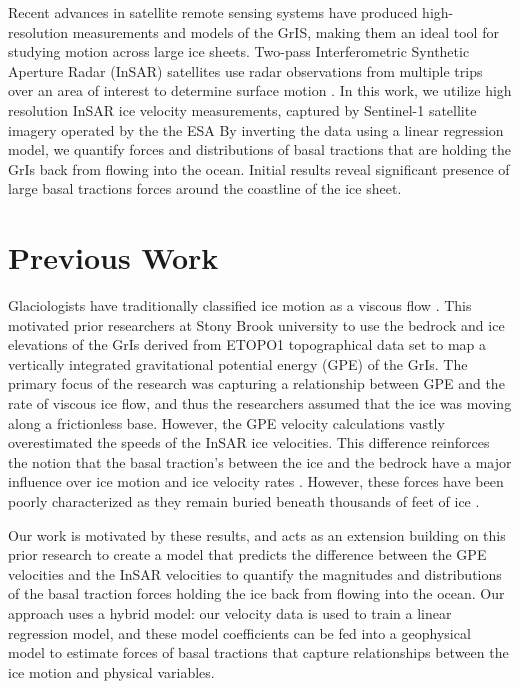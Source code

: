 \documentclass{article}
\begin{document}
Recent advances in satellite remote sensing systems have produced high-resolution measurements and models of the GrIS, making them an ideal tool for studying motion across large ice sheets. Two-pass Interferometric Synthetic Aperture Radar (InSAR) satellites use radar observations from multiple trips over an area of interest to determine surface motion \cite{wild_differential_2019}. In this work, we utilize high resolution InSAR ice velocity measurements, captured by Sentinel-1 satellite imagery operated by the the ESA By inverting the data using a linear regression model, we quantify forces and distributions of basal tractions that are holding the GrIs back from flowing into the ocean. Initial results reveal significant presence of large basal tractions forces around the coastline of the ice sheet.

\section{Previous Work}

Glaciologists have traditionally classified ice motion as a viscous flow \cite{morland_steady_1980}. This motivated prior researchers at Stony Brook university to use the bedrock and ice elevations of the GrIs derived from ETOPO1 topographical data set to map a vertically integrated gravitational potential energy (GPE) of the GrIs. The primary focus of the research was capturing a relationship between GPE and the rate of viscous ice flow, and thus the researchers assumed that the ice was moving along a frictionless base. However, the GPE velocity calculations vastly overestimated the speeds of the InSAR ice velocities. This difference reinforces the notion that the basal traction's between the ice and the bedrock have a major influence over ice motion and ice velocity rates \cite{maier_basal_2021}. However, these forces have been poorly characterized as they remain buried beneath thousands of feet of ice \cite{maier_basal_2021}.

Our work is motivated by these results, and acts as an extension building on this prior research to create a model that predicts the difference between the GPE velocities and the InSAR velocities to quantify the magnitudes and distributions of the basal traction forces holding the ice back from flowing into the ocean. Our approach uses a hybrid model: our velocity data is used to train a linear regression model, and these model coefficients can be fed into a geophysical model to estimate forces of basal tractions that capture relationships between the ice motion and physical variables.
\end{document}
